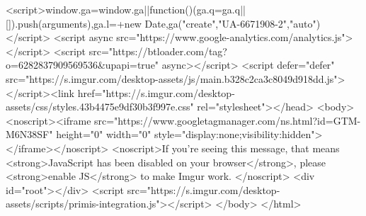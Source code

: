 <script>window.ga=window.ga||function(){(ga.q=ga.q||[]).push(arguments)},ga.l=+new Date,ga("create","UA-6671908-2","auto")</script> <script async src="https://www.google-analytics.com/analytics.js"></script> <script src="https://btloader.com/tag?o=6282837909569536&upapi=true" async></script> <script defer="defer" src="https://s.imgur.com/desktop-assets/js/main.b328c2ca3c8049d918dd.js"></script><link href="https://s.imgur.com/desktop-assets/css/styles.43b4475e9df30b3f997e.css" rel="stylesheet"></head> <body> <noscript><iframe src="https://www.googletagmanager.com/ns.html?id=GTM-M6N38SF" height="0" width="0" style="display:none;visibility:hidden"></iframe></noscript> <noscript>If you're seeing this message, that means <strong>JavaScript has been disabled on your browser</strong>, please <strong>enable JS</strong> to make Imgur work. </noscript> <div id="root"></div> <script src="https://s.imgur.com/desktop-assets/scripts/primis-integration.js"></script> </body> </html> 